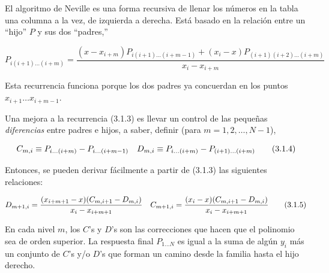 \documentclass[10pt,a4paper]{book}
\begin{document}
\begin{equation}
\tag{3.1.2}
\end{equation}

El algoritmo de Neville es una forma recursiva de llenar los números en la tabla una columna a la vez, de izquierda a derecha. Está basado en la relación entre un ``hijo'' $P$ y sus dos ``padres,''

\begin{equation}
P_{i(i+1)\ldots(i+m)} = 
\frac{(x - x_{i+m}) P_{i(i+1)\ldots(i+m-1)} + (x_i - x) P_{(i+1)(i+2)\ldots(i+m)}}{x_i - x_{i+m}}
\tag{3.1.3}
\end{equation}

Esta recurrencia funciona porque los dos padres ya concuerdan en los puntos $x_{i+1} \ldots x_{i+m-1}$.

Una mejora a la recurrencia (3.1.3) es llevar un control de las pequeñas 
\textit{diferencias} entre padres e hijos, a saber, definir (para $m = 1, 2, \ldots, N - 1$),

\begin{equation}
C_{m,i} \equiv P_{i\ldots(i+m)} - P_{i\ldots(i+m-1)} \\
\quad D_{m,i} \equiv P_{i\ldots(i+m)} - P_{(i+1)\ldots(i+m)} 
\tag{3.1.4}
\end{equation}

Entonces, se pueden derivar fácilmente a partir de (3.1.3) las siguientes relaciones:

\begin{equation}
D_{m+1,i} = \frac{(x_{i+m+1} - x)(C_{m,i+1} - D_{m,i})}{x_i - x_{i+m+1}} \\
\quad C_{m+1,i} = \frac{(x_i - x)(C_{m,i+1} - D_{m,i})}{x_i - x_{i+m+1}} 
\tag{3.1.5}
\end{equation}

En cada nivel $m$, los $C$'s y $D$'s son las correcciones que hacen que el polinomio sea de orden superior. La respuesta final $P_{1\ldots N}$ es igual a la suma de algún $y_i$ más un conjunto de $C$'s y/o $D$'s que forman un camino desde la familia hasta el hijo derecho.
\end{document}
